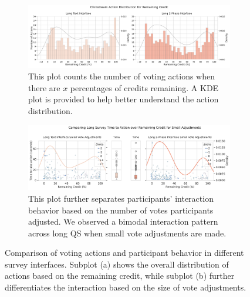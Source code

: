 \begin{figure}[h]
    \centering
    \begin{subfigure}[b]{\textwidth}
        \centering
        \includegraphics[width=\textwidth]{content/image/results/new_clickstream_action_distribution_lower_row.pdf}
        \caption{This plot counts the number of voting actions when there are $x$ percentages of credits remaining. A KDE plot is provided to help better understand the action distribution.}
        \label{fig:all_clicks}
    \end{subfigure}
    
    \vspace{1em} %
    
    \begin{subfigure}[b]{\textwidth}
        \centering
        \includegraphics[width=\textwidth]{content/image/results/small_adjustments_plot.pdf}
        \caption{This plot further separates participants' interaction behavior based on the number of votes participants adjusted. We observed a bimodal interaction pattern across long QS when small vote adjustments are made.}
        \label{fig:small_clicks}
    \end{subfigure}
    
    \caption{Comparison of voting actions and participant behavior in different survey interfaces. Subplot (a) shows the overall distribution of actions based on the remaining credit, while subplot (b) further differentiates the interaction based on the size of vote adjustments.}
    \label{fig:combined_voting_behavior}
\end{figure}


